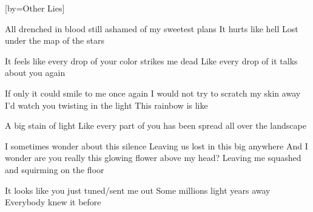 [by={Other Lies}]

  \chordsoff

  \beginverse
  All drenched in blood still ashamed of my sweetest plans
  It hurts like hell 
  Lost under the map of the stars

  It feels like every drop of your color strikes me dead 
  Like every drop of it talks about you again
  \endverse

  \beginverse
  If only it could smile to me once again
  I would not try to scratch my skin away
  I’d watch you twisting in the light
  This rainbow is like 
  \endverse

  \beginchorus
  A big stain of light
  Like every part of you has been spread all over the landscape
  \endchorus

  \beginverse
  I sometimes wonder about this silence
  Leaving us lost in this big anywhere
  And I wonder are you really this glowing flower above my head?
  Leaving me squashed and squirming on the floor
  \endverse

  \beginverse
  It looks like you just tuned/sent me out
  Some millions light years away
  Everybody knew it before
  \endverse

\endsong
